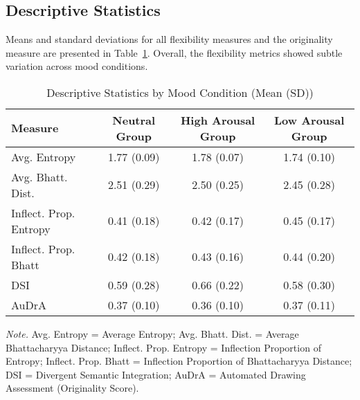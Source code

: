 \documentclass[../MA_Thesis.tex]{subfiles}
\begin{document}


\subsection*{Descriptive Statistics}

Means and standard deviations for all flexibility measures and the originality measure are presented in Table~\ref{tab:descriptive_stats}. Overall, the flexibility metrics showed subtle variation across mood conditions. 

\begin{table}[H]
\centering
\begin{threeparttable}
\caption{Descriptive Statistics by Mood Condition (Mean (SD))}
\label{tab:descriptive_stats}
\begin{tabular}{lccc}
\toprule
\textbf{Measure} & \textbf{Neutral Group} & \textbf{High Arousal Group} & \textbf{Low Arousal Group} \\
\midrule
Avg. Entropy & 1.77 (0.09) & 1.78 (0.07) & 1.74 (0.10) \\
Avg. Bhatt. Dist. & 2.51 (0.29) & 2.50 (0.25) & 2.45 (0.28) \\
Inflect. Prop. Entropy & 0.41 (0.18) & 0.42 (0.17) & 0.45 (0.17) \\
Inflect. Prop. Bhatt & 0.42 (0.18) & 0.43 (0.16) & 0.44 (0.20) \\
DSI & 0.59 (0.28) & 0.66 (0.22) & 0.58 (0.30) \\
AuDrA & 0.37 (0.10) & 0.36 (0.10) & 0.37 (0.11) \\
\bottomrule
\end{tabular}
\begin{tablenotes}[flushleft]
\small
\item \textit{Note.} Avg. Entropy = Average Entropy; Avg. Bhatt. Dist. = Average Bhattacharyya Distance; Inflect. Prop. Entropy = Inflection Proportion of Entropy; Inflect. Prop. Bhatt = Inflection Proportion of Bhattacharyya Distance; DSI = Divergent Semantic Integration; AuDrA = Automated Drawing Assessment (Originality Score).
\end{tablenotes}
\end{threeparttable}
\end{table}
\end{document}

